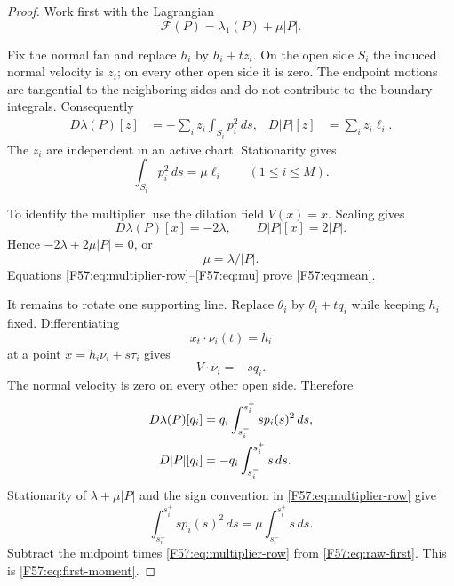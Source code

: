 \begin{proof}
Work first with the Lagrangian
\begin{equation}
 \mathcal F(P)=\lambda_1(P)+\mu |P|.
\end{equation}

Fix the normal fan and replace $h_i$ by $h_i+t z_i$.  On the open side
$S_i$ the induced normal velocity is $z_i$; on every other open side it is
zero.  The endpoint motions are tangential to the neighboring sides and do
not contribute to the boundary integrals.  Consequently
\begin{align}
 D\lambda(P)[z]&=-\sum_i z_i\int_{S_i}p_i^2\,ds,
 &D|P|[z]&=\sum_i z_i\ell_i.
\end{align}
The $z_i$ are independent in an active chart.  Stationarity gives
\begin{equation}\label{F57:eq:multiplier-row}
 \int_{S_i}p_i^2\,ds=\mu\ell_i
 \qquad(1\le i\le M).
\end{equation}

To identify the multiplier, use the dilation field $V(x)=x$.  Scaling gives
\begin{equation}
 D\lambda(P)[x]=-2\lambda,\qquad D|P|[x]=2|P|.
\end{equation}
Hence $-2\lambda+2\mu|P|=0$, or
\begin{equation}\label{F57:eq:mu}
 \mu=\lambda/|P|.
\end{equation}
Equations \eqref{F57:eq:multiplier-row}--\eqref{F57:eq:mu} prove
\eqref{F57:eq:mean}.

It remains to rotate one supporting line.  Replace
$\theta_i$ by $\theta_i+tq_i$ while keeping $h_i$ fixed.  Differentiating
\begin{equation}
 x_t\cdot\nu_i(t)=h_i
\end{equation}
at a point $x=h_i\nu_i+s\tau_i$ gives
\begin{equation}\label{F57:eq:rot-velocity}
 V\cdot\nu_i=-s q_i.
\end{equation}
The normal velocity is zero on every other open side.  Therefore
\begin{align}
 D\lambda(P)[q_i]
 &=q_i\int_{s_i^-}^{s_i^+}s p_i(s)^2\,ds,\notag\\
 D|P|[q_i]
 &=-q_i\int_{s_i^-}^{s_i^+}s\,ds.
\end{align}
Stationarity of $\lambda+\mu|P|$ and the sign convention in
\eqref{F57:eq:multiplier-row} give
\begin{equation}\label{F57:eq:raw-first}
 \int_{s_i^-}^{s_i^+}s p_i(s)^2\,ds
 =\mu\int_{s_i^-}^{s_i^+}s\,ds.
\end{equation}
Subtract the midpoint times \eqref{F57:eq:multiplier-row} from
\eqref{F57:eq:raw-first}.  This is \eqref{F57:eq:first-moment}.
\end{proof}

